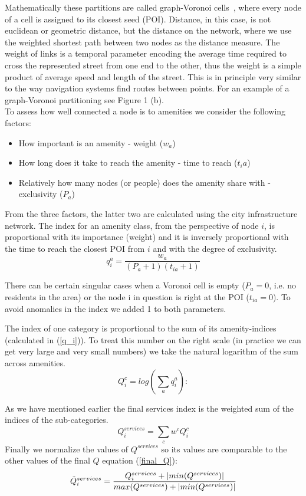 Mathematically these partitions are called graph-Voronoi cells~\cite{Erwig2000Graph,Deritei2014Community}, where every node of a cell is assigned to its closest seed (POI). Distance, in this case, is not euclidean or geometric distance, but the distance on the network, where we use the weighted shortest path between two nodes as the distance measure. The weight of links is a temporal parameter encoding the average time required to cross the represented street from one end to the other, thus the weight is a simple product of average speed and length of the street. This is in principle very similar to the way navigation systems find routes between points. For an example of a graph-Voronoi partitioning see Figure 1 (b).\\
To assess how well connected a node is to amenities we consider the following factors:
\begin{itemize}
	\item How important is an amenity - weight ($w_a$)
	\item How long does it take to reach the amenity - time to reach ($t_ia$)
	\item Relatively how many nodes (or people) does the amenity share with - exclusivity ($P_a$)
\end{itemize}

From the three factors, the latter two are calculated using the city infrastructure network. The index for an amenity class, from the perspective of node $i$, is proportional with its importance (weight) and it is inversely proportional with the time to reach the closest POI from $i$ and with the degree of exclusivity.
\begin{equation}\label{q_i}
	q_i^a=\frac{w_{a}}{(P_a+1)(t_{ia}+1)}
\end{equation}

There can be certain singular cases when a Voronoi cell is empty ($P_a=0$, i.e. no residents in the area) or the node i in question is right at the POI ($t_{ia}=0$). To avoid anomalies in the index we added 1 to both parameters.

The index of one category is proportional to the sum of its amenity-indices (calculated in (\ref{q_i})). To treat this number on the right scale (in practice we can get very large and very small numbers) we take the natural logarithm of the sum across amenities.
\begin{equation}
	Q_i^c=log(\sum_a q_i^a):
\end{equation}

As we have mentioned earlier the final services index is the weighted sum of the indices of the sub-categories.
$$Q_i^{services} =\sum_c w^cQ_i^c $$
Finally we normalize the values of $Q^{services}$ so its values are comparable to the other values of the final $Q$ equation (\ref{final_Q}):
\begin{equation}
	\Tilde{Q}_i^{services} =\frac{Q_i^{services}+|min(Q^{services})|}{max(Q^{services})+|min(Q^{services})|}
\end{equation}

